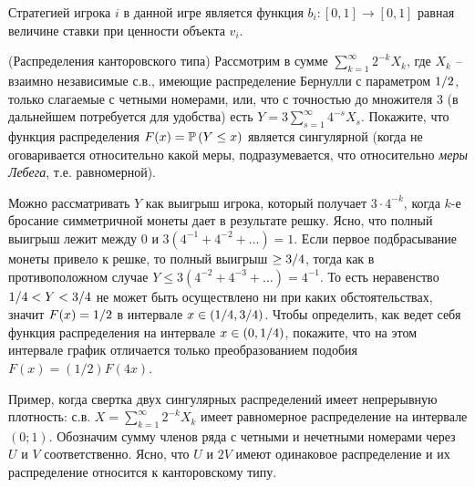 \begin{ordre}
Стратегией игрока $i$ в данной игре является функция $b_i: [0, 1] \rightarrow [0, 1]$ равная величине ставки при ценности объекта  $v_i$.
\end{ordre}


\begin{problem}(Распределения канторовского типа)
Рассмотрим в сумме $\sum_{k=1}^\infty 2^{-k} X_{k}$, где $X_{k} $ -- взаимно независимые с.в., имеющие распределение Бернулли с параметром ${1\mathord{\left/ {\vphantom {1 2}} \right. \kern-\nulldelimiterspace} 2} $, только слагаемые с четными номерами, или, что с точностью до множителя 3 (в дальнейшем потребуется для удобства) есть $Y=3\sum _{s=1}^{\infty }4^{-s} X_{s}  $. Покажите, что функция распределения $F(x)=\mathrm{{\mathbb P}}\left(Y\le x\right)$ является сингулярной (когда не оговаривается относительно какой меры, подразумевается, что относительно \textit{меры Лебега}, т.е. равномерной).


\begin{ordre}
Можно рассматривать $Y$ как выигрыш игрока, который получает $3\cdot 4^{-k} $, когда $k$-е бросание симметричной монеты дает в результате решку. Ясно, что полный выигрыш лежит между 0 и $3\left(4^{-1} +4^{-2} +\ldots \right)=1$. Если первое подбрасывание монеты привело к решке, то полный выигрыш $\ge {3\mathord{\left/ {\vphantom {3 4}} \right. \kern-\nulldelimiterspace} 4} $, тогда как в противоположном случае $Y\le 3\left(4^{-2} +4^{-3} +\ldots \right)=4^{-1} $. То есть неравенство ${1\mathord{\left/ {\vphantom {1 4}} \right. \kern-\nulldelimiterspace} 4} <Y<{3\mathord{\left/ {\vphantom {3 4}} \right. \kern-\nulldelimiterspace} 4} $ не может быть осуществлено ни при каких обстоятельствах, значит $F(x)={1\mathord{\left/ {\vphantom {1 2}} \right. \kern-\nulldelimiterspace} 2} $ в интервале $x\in \left({1\mathord{\left/ {\vphantom {1 4}} \right. \kern-\nulldelimiterspace} 4} ,{3\mathord{\left/ {\vphantom {3 4}} \right. \kern-\nulldelimiterspace} 4} \right)$. Чтобы определить, как ведет себя функция распределения на интервале $x\in \left(0,{1\mathord{\left/ {\vphantom {1 4}} \right. \kern-\nulldelimiterspace} 4} \right)$, покажите, что на этом интервале график отличается только преобразованием подобия $F(x)=(1/2)F(4x)$.

\end{ordre}

\begin{remark}
Пример, когда свертка двух сингулярных распределений имеет непрерывную плотность: с.в. $X=\sum _{k=1}^{\infty }2^{-k} X_{k}  $ имеет равномерное распределение на интервале $\left(0;1\right)$. Обозначим сумму членов ряда с четными и нечетными номерами через $U$ и $V$ соответственно. Ясно, что $U$ и $2V$ имеют одинаковое распределение и их распределение относится к канторовскому типу.
\end{remark}

\end{problem}



